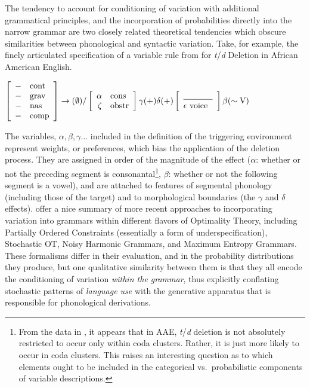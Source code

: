 The tendency to account for conditioning of variation with additional grammatical principles, and the incorporation of probabilities directly into the narrow grammar are two closely related theoretical tendencies which obscure similarities between phonological and syntactic variation.
Take, for example, the finely articulated specification of a variable rule from \citet{3288} for {\sl t}/{\sl d} Deletion in African American English.
\begin{exe}
 \ex $\left[\begin{array}{rl}
	-&\mbox{cont}\\
	-&\mbox{grav}\\
	-&\mbox{nas}\\
	-&\mbox{comp}
\end{array}\right] \rightarrow (\emptyset) / 
\left[
	\begin{array}{rl}
		\alpha & \mbox{cons}\\
		\zeta &  \mbox{obstr}
	\end{array}
\right]\gamma(\mbox{+})\delta(\mbox{+})
\left[
	\begin{array}{l}
	\underline{\hskip 35pt}\\
	\epsilon~\mbox{voice}
	\end{array}
\right]
\beta(\sim \mbox{V})$ \label{variable.rule}
\end{exe}
The variables, $\alpha, \beta, \gamma \ldots$ included in the definition of the triggering environment represent weights, or preferences, which bias the application of the deletion process. 
They are assigned in order of the magnitude of the effect ($\alpha$: whether or not the preceding segment is consonantal\footnote{From the data in \citet{3288}, it appears that in AAE, {\sl t}/{\sl d} deletion is not absolutely restricted to occur only within coda clusters.
Rather, it is just more likely to occur in coda clusters.
This raises an interesting question as to which elements ought to be included in the categorical vs.\ probabilistic components of variable descriptions.},
$\beta$: whether or not the following segment is a vowel), and are attached to features of segmental phonology (including those of the target) and to morphological boundaries (the $\gamma$ and $\delta$ effects).
\citet{Coetzee2011} offer a nice summary of more recent approaches to incorporating variation into grammars within different flavors of Optimality Theory, including Partially Ordered Constraints (essentially a form of underspecification), Stochastic OT, Noisy Harmonic Grammars, and Maximum Entropy Grammars.
These formalisms differ in their evaluation, and in the probability distributions they produce, but one qualitative similarity between them is that they all encode the conditioning of variation \emph{within the grammar}, thus explicitly conflating stochastic patterns of \textsl{language use} with the generative apparatus that is responsible for phonological derivations. 


